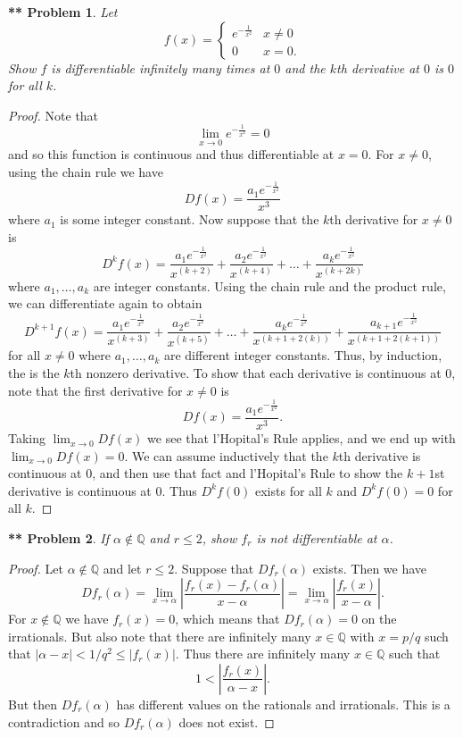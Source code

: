 \documentclass{article}
\newtheorem{**}{** Problem}
\begin{document}
\begin{flushleft}
\begin{**}
Let
\[
f(x) =
\begin{cases}
e^{-\frac{1}{x^2}} & x \neq 0\\
0 & x = 0.
\end{cases}
\]
Show $f$ is differentiable infinitely many times at $0$ and the $k$th derivative at $0$ is $0$ for all $k$.
\end{**}
\begin{proof}
Note that
\[
\lim_{x \rightarrow 0} e^{-\frac{1}{x^2}} = 0
\]
and so this function is continuous and thus differentiable at $x = 0$. For $x \neq 0$, using the chain rule we have
\[
Df(x) = \frac{a_1 e^{-\frac{1}{x^2}}}{x^3}
\]
where $a_1$ is some integer constant. Now suppose that the $k$th derivative for $x \neq 0$ is
\[
D^kf(x) = \frac{a_1 e^{-\frac{1}{x^2}}}{x^{(k+2)}} + \frac{a_2 e^{-\frac{1}{x^2}}}{x^{(k+4)}} + \dots + \frac{a_k e^{-\frac{1}{x^2}}}{x^{(k+2k)}}
\]
where $a_1, \dots , a_k$ are integer constants. Using the chain rule and the product rule, we can differentiate again to obtain
\[
D^{k+1}f(x) = \frac{a_1 e^{-\frac{1}{x^2}}}{x^{(k+3)}} + \frac{a_2 e^{-\frac{1}{x^2}}}{x^{(k+5)}} + \dots + \frac{a_k e^{-\frac{1}{x^2}}}{x^{(k+1+2(k))}} + \frac{a_{k+1} e^{-\frac{1}{x^2}}}{x^{(k+1+2(k+1))}}
\]
for all $x \neq 0$ where $a_1, \dots , a_k$ are different integer constants. Thus, by induction, the is the $k$th nonzero derivative. To show that each derivative is continuous at $0$, note that the first derivative for $x \neq 0$ is
\[
Df(x) = \frac{a_1 e^{-\frac{1}{x^2}}}{x^3}.
\]
Taking $\lim_{x \rightarrow 0} Df(x)$ we see that l'Hopital's Rule applies, and we end up with $\lim_{x \rightarrow 0} Df(x) = 0$. We can assume inductively that the $k$th derivative is continuous at $0$, and then use that fact and l'Hopital's Rule to show the $k+1$st derivative is continuous at $0$. Thus $D^kf(0)$ exists for all $k$ and $D^kf(0) = 0$ for all $k$.
\end{proof}

\begin{**}
If $\alpha \notin \mathbb{Q}$ and $r \leq 2$, show $f_r$ is not differentiable at $\alpha$.
\end{**}
\begin{proof}
Let $\alpha \notin \mathbb{Q}$ and let $r \leq 2$. Suppose that $Df_r(\alpha)$ exists. Then we have
\[
Df_r(\alpha) = \lim_{x \rightarrow \alpha} \left | \frac{f_r(x) - f_r(\alpha)}{x-\alpha} \right | = \lim_{x \rightarrow \alpha} \left | \frac{f_r(x)}{x-\alpha} \right |.
\]
For $x \notin \mathbb{Q}$ we have $f_r(x) = 0$, which means that $Df_r(\alpha) = 0$ on the irrationals. But also note that there are infinitely many $x \in \mathbb{Q}$ with $x = p/q$ such that $|\alpha - x| < 1/q^2 \leq |f_r(x)|$. Thus there are infinitely many $x \in \mathbb{Q}$ such that
\[
1 < \left | \frac{f_r(x)}{\alpha - x} \right |.
\]
But then $Df_r(\alpha)$ has different values on the rationals and irrationals. This is a contradiction and so $Df_r(\alpha)$ does not exist.
\end{proof}


\end{flushleft}
\end{document}
